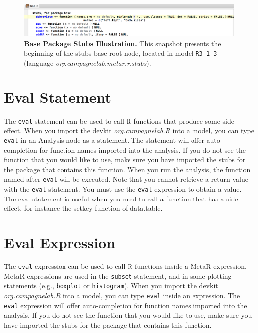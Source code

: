 \begin{figure}[h!tbp]
  \centering
  \includegraphics[width=\figWidthWide]{figures/BaseStubsSnapshot.png}
\caption[Base Package Stubs Illustration.]{\textbf{Base Package Stubs Illustration.}  This snapshot presents the beginning of the stubs base root node, located in model \texttt{R3\_1\_3} (language \textit{org\allowbreak{}.campagnelab\allowbreak{}.metar\allowbreak{}.r\allowbreak{}.stubs}).}
\label{fig:StubsExample}
\end{figure}

\section{Eval Statement}\label{sec:EvalStatement}
The \texttt{eval} statement can be used to call R functions that produce some side-effect. When you import the devkit \textit{org.campagnelab.R} into a model, you can type \texttt{eval} in an Analysis node as a statement. The statement will offer auto-completion for function names imported into the analysis. If you do not see the function that you would like to use, make sure you have imported the stubs for the package that contains this function. When you run the analysis, the function named after \texttt{eval} will be executed. Note that you cannot retrieve a return value with the \texttt{eval} statement. You must use the \texttt{eval} expression to obtain a value. The eval statement is useful when you need to call a function that has a side-effect, for instance the setkey function of data.table.

\section{Eval Expression}\label{sec:EvalExpression}
The \texttt{eval} expression can be used to call R functions inside a MetaR expression. MetaR expressions are used in the \texttt{subset} statement, and in some plotting statements (e.g., \texttt{boxplot} or \texttt{histogram}).  When you import the devkit \textit{org.campagnelab.R} into a model, you can type \texttt{eval} inside an expression. The \texttt{eval} expression will offer auto-completion for function names imported into the analysis. If you do not see the function that you would like to use, make sure you have imported the stubs for the package that contains this function. 


